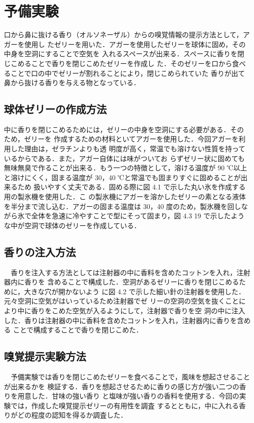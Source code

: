 \section{予備実験}
口から鼻に抜ける香り（オルソネーザル）からの嗅覚情報の提示方法として，アガーを使用し
たゼリーを用いた．アガーを使用したゼリーを球体に固め，その中身を空洞にすることで空気を
入れるスペースが出来る．スペースに香りを閉じこめることで香りを閉じこめたゼリーを作成し
た．そのゼリーを口から食べることで口の中でゼリーが割れることにより，閉じこめられていた
香りが出て鼻から抜ける香りを与える物となっている．

\subsection{球体ゼリーの作成方法}
中に香りを閉じこめるためには，ゼリーの中身を空洞にする必要がある．そのため，ゼリーを
作成するための材料といてアガーを使用した．今回アガーを利用した理由は，ゼラチンよりも透
明度が高く，常温でも溶けない性質を持っているからである．また，アガー自体には味がついてお
らずゼリー状に固めても無味無臭で作ることが出来る．もう一つの特徴として，溶ける温度が 90
℃以上と溶けにくく，固まる温度が 30，40 ℃と常温でも固まりすぐに固めることが出来るため
扱いやすく丈夫である．固める際に図 4.1 で示した丸い氷を作成する用の製氷機を使用した．こ
の製氷機にアガーを溶かしたゼリーの素となる液体を半分まで流し込む．アガーの固まる温度は
30，40 度のため，製氷機を回しながら氷で全体を急速に冷やすことで型にそって固まり，図 4.3
19
で示したような中が空洞で球体のゼリーを作成している．


\subsection{香りの注入方法}
　香りを注入する方法としては注射器の中に香料を含めたコットンを入れ，注射器内に香りを
含めることで構成した．空洞があるゼリーに香りを閉じこめるために，大きな穴が開かないよう
に図 4.2 で示した細い針の注射器を使用した．元々空洞に空気がはいっているため注射器でゼ
リーの空洞の空気を抜くことにより中に香りをこめた空気が入るようにして，注射器で香りを空
洞の中に注入した．香りは注射器の中に香料を含めたコットンを入れ，注射器内に香りを含める
ことで構成することで香りを閉じこめた．


\subsection{嗅覚提示実験方法}
　予備実験では香りを閉じこめたゼリーを食べることで，風味を想起させることが出来るかを
検証する．香りを想起させるために香りの感じ方が強い二つの香りを用意した．甘味の強い香り
と塩味が強い香りの香料を使用する．今回の実験では，作成した嗅覚提示ゼリーの有用性を調査
するとともに，中に入れる香りがどの程度の認知を得るか調査した．

